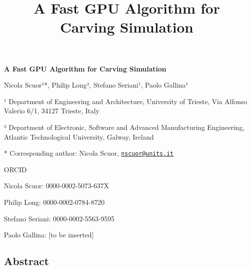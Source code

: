 \documentclass[
]{article}
\title{A Fast GPU Algorithm for Carving Simulation}
\author{}
\date{}
\begin{document}
\begin{center}
{\LARGE\bfseries A Fast GPU Algorithm for Carving Simulation}\par
\end{center}
\bigskip


Nicola Scuor¹*, Philip Long², Stefano Seriani¹, Paolo Gallina¹

¹ Department of Engineering and Architecture, University of Trieste, Via
Alfonso Valerio 6/1, 34127 Trieste, Italy

² Department of Electronic, Software and Advanced Manufacturing
Engineering, Atlantic Technological University, Galway, Ireland

* Corresponding author: Nicola Scuor,
\href{mailto:nscuor@units.it}{\nolinkurl{nscuor@units.it}}

ORCID

Nicola Scuor: 0000-0002-5073-637X

Philip Long: 0000-0002-0784-8720

Stefano Seriani: 0000-0002-5563-9595

Paolo Gallina: {[}to be inserted{]}

\hypertarget{abstract}{%
\subsection{Abstract}\label{abstract}}
\end{document}
